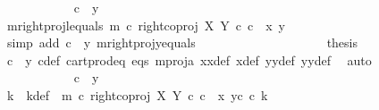 \begin{isabellebody}
\ \ \ \ \ \ \ \ \ \ \isamarkupfalse%
\ {\isachardoublequoteopen}c\ {\isacharequal}{\kern0pt}\ y{}{\isachardoublequoteclose}\ \ \ \ \ \ \ \isanewline
\ \ \ \ \ \ \ \ \ \ \isamarkupfalse%
\ m{\isacharunderscore}{\kern0pt}rightproj{\isacharunderscore}{\kern0pt}l{\isacharunderscore}{\kern0pt}equals{\isacharcolon}{\kern0pt}\ {\isachardoublequoteopen}m\ {\isasymcirc}\isactrlsub c\ right{\isacharunderscore}{\kern0pt}coproj\ X\ Y\ {\isasymcirc}\isactrlsub c\ c\ {\isacharequal}{\kern0pt}\ {\isasymlangle}x{}{\isacharcomma}{\kern0pt}\ y{}{\isasymrangle}{\isachardoublequoteclose}\isanewline
\ \ \ \ \ \ \ \ \ \ \ \ \isamarkupfalse%
\ {\isacharparenleft}{\kern0pt}simp\ add{\isacharcolon}{\kern0pt}\ {\isacartoucheopen}c\ {\isacharequal}{\kern0pt}\ y{}{\isacartoucheclose}\ m{\isacharunderscore}{\kern0pt}rightproj{\isacharunderscore}{\kern0pt}y{}{\isacharunderscore}{\kern0pt}equals{\isacharparenright}{\kern0pt}\ \ \ \ \ \ \ \isanewline
\ \ \ \ \ \ \ \ \ \ \isamarkupfalse%
\ \isamarkupfalse%
\ {\isacharquery}{\kern0pt}thesis\isanewline
\ \ \ \ \ \ \ \ \ \ \ \ \isamarkupfalse%
\ {\isacartoucheopen}c\ {\isacharequal}{\kern0pt}\ y{}{\isacartoucheclose}\ c{\isacharunderscore}{\kern0pt}def\ cart{\isacharunderscore}{\kern0pt}prod{\isacharunderscore}{\kern0pt}eq{}\ eqs\ m{\isacharunderscore}{\kern0pt}proj{\isacharunderscore}{\kern0pt}a\ x{}x{}{\isacharunderscore}{\kern0pt}def{\isacharparenleft}{\kern0pt}{}{\isacharparenright}{\kern0pt}\ x{\isacharunderscore}{\kern0pt}def\ y{}y{}{\isacharunderscore}{\kern0pt}def{\isacharparenleft}{\kern0pt}{}{\isacharparenright}{\kern0pt}\ y{}y{}{\isacharunderscore}{\kern0pt}def{\isacharparenleft}{\kern0pt}{}{\isacharparenright}{\kern0pt}\ \isamarkupfalse%
\ auto\isanewline
\ \ \ \ \ \ \ \ \isamarkupfalse%
\isanewline
\ \ \ \ \ \ \ \ \ \ \isamarkupfalse%
\ {\isachardoublequoteopen}c\ {\isasymnoteq}\ y{}{\isachardoublequoteclose}\ \ \ \ \ \ \ \isanewline
\ \ \ \ \ \ \ \ \ \ \isamarkupfalse%
\ \isamarkupfalse%
\ k\ \ k{\isacharunderscore}{\kern0pt}def{\isacharcolon}{\kern0pt}\ \ {\isachardoublequoteopen}m\ {\isasymcirc}\isactrlsub c\ right{\isacharunderscore}{\kern0pt}coproj\ X\ Y\ {\isasymcirc}\isactrlsub c\ c\ {\isacharequal}{\kern0pt}\ {\isasymlangle}x{}{\isacharcomma}{\kern0pt}\ y{}\isactrlsup c\ {\isasymcirc}\isactrlsub c\ k{\isasymrangle}{\isachardoublequoteclose}\isanewline

\end{isabellebody}
